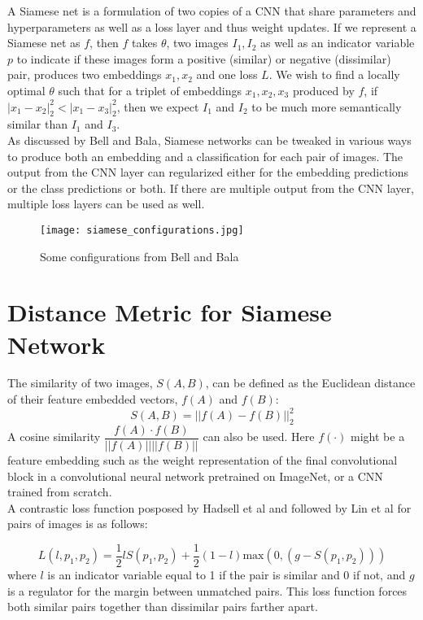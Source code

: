 \documentclass[pageno]{jpaper}
\begin{document}
A Siamese net is a formulation of two copies of a CNN that share parameters and hyperparameters as well as a loss layer and thus weight updates. If we represent a Siamese net as $f$, then $f$ takes $\theta$, two images $I_1, I_2$ as well as an indicator variable $p$ to indicate if these images form a positive (similar) or negative (dissimilar) pair, produces two embeddings $x_1, x_2$ and one loss $L$. We wish to find a locally optimal $\theta$ such that for a triplet of embeddings $x_1, x_2, x_3$ produced by $f$, if $|x_1 - x_2|_2^2 < |x_1 - x_3|_2^2$, then we expect $I_1$ and $I_2$ to be much more semantically similar than $I_1$ and $I_3$.\\

As discussed by Bell and Bala\cite{bell2015learning}, Siamese networks can be tweaked in various ways to produce both an embedding and a classification for each pair of images. The output from the CNN layer can regularized either for the embedding predictions or the class predictions or both. If there are multiple output from the CNN layer, multiple loss layers can be used as well.

\begin{figure}[!htbp]
  \label{fig:siamese_configurations}
  \centering
  \texttt{[image: siamese\_configurations.jpg]}
  \caption{Some configurations from Bell and Bala}
\end{figure}


\section{Distance Metric for Siamese Network}
The similarity of two images, $S(A,B)$, can be defined as the Euclidean distance of their feature embedded vectors, $f(A)$ and $f(B)$:
\begin{equation}
	S(A,B) = ||f(A) - f(B)||_2^2
\end{equation}
A cosine similarity $\dfrac{f(A) \cdot f(B)}{||f(A)||||f(B)||}$ can also be used. Here $f(\cdot)$ might be a feature embedding such as the weight representation of the final convolutional block in a convolutional neural network pretrained on ImageNet, or a CNN trained from scratch.\\

A contrastic loss function posposed by Hadsell et al and followed by Lin et al for pairs of images is as follows:

\begin{equation}
	L(l, p_1, p_2) = \dfrac{1}{2}lS(p_1, p_2) + \dfrac{1}{2}(1-l)\text{max}(0, (g-S(p_1,p_2)))
\end{equation}
where $l$ is an indicator variable equal to 1 if the pair is similar and 0 if not, and $g$ is a regulator for the margin between unmatched pairs.\cite{hadsell2006dimensionality}\cite{lin2015learning} This loss function forces both similar pairs together than dissimilar pairs farther apart. \\
\end{document}
